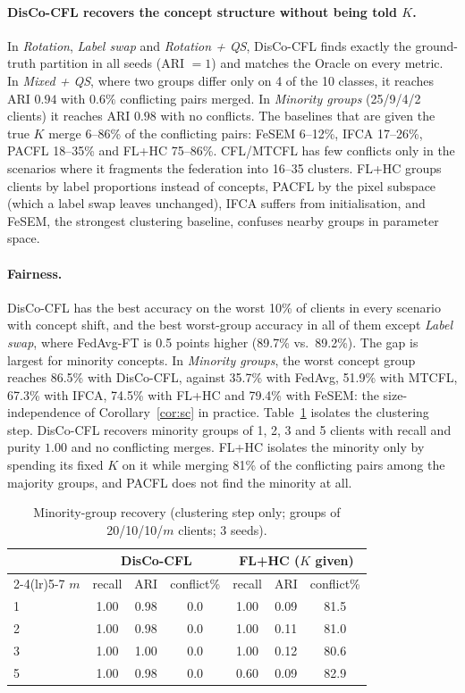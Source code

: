\paragraph{DisCo-CFL recovers the concept structure without being told $K$.} In \emph{Rotation}, \emph{Label swap} and \emph{Rotation + QS}, DisCo-CFL finds exactly the ground-truth partition in all seeds (ARI $=1$) and matches the Oracle on every metric. In \emph{Mixed + QS}, where two groups differ only on 4 of the 10 classes, it reaches ARI $0.94$ with $0.6\%$ conflicting pairs merged. In \emph{Minority groups} (25/9/4/2 clients) it reaches ARI $0.98$ with no conflicts. The baselines that are given the true $K$ merge 6--86\% of the conflicting pairs: FeSEM 6--12\%, IFCA 17--26\%, PACFL 18--35\% and FL+HC 75--86\%. CFL/MTCFL has few conflicts only in the scenarios where it fragments the federation into 16--35 clusters. FL+HC groups clients by label proportions instead of concepts, PACFL by the pixel subspace (which a label swap leaves unchanged), IFCA suffers from initialisation, and FeSEM, the strongest clustering baseline, confuses nearby groups in parameter space.

\paragraph{Fairness.} DisCo-CFL has the best accuracy on the worst 10\% of clients in every scenario with concept shift, and the best worst-group accuracy in all of them except \emph{Label swap}, where FedAvg-FT is 0.5 points higher (89.7\% vs.\ 89.2\%). The gap is largest for minority concepts. In \emph{Minority groups}, the worst concept group reaches 86.5\% with DisCo-CFL, against 35.7\% with FedAvg, 51.9\% with MTCFL, 67.3\% with IFCA, 74.5\% with FL+HC and 79.4\% with FeSEM: the size-independence of Corollary~\ref{cor:sc} in practice. Table~\ref{tab:minority} isolates the clustering step. DisCo-CFL recovers minority groups of 1, 2, 3 and 5 clients with recall and purity $1.00$ and no conflicting merges. FL+HC isolates the minority only by spending its fixed $K$ on it while merging 81\% of the conflicting pairs among the majority groups, and PACFL does not find the minority at all.

\begin{table}[!htbp]
\centering
\caption{Minority-group recovery (clustering step only; groups of 20/10/10/$m$ clients; 3 seeds).}\label{tab:minority}
\small
\begin{tabular}{lcccccc}
\toprule
& \multicolumn{3}{c}{DisCo-CFL} & \multicolumn{3}{c}{FL+HC ($K$ given)} \\
\cmidrule(lr){2-4}\cmidrule(lr){5-7}
$m$ & recall & ARI & conflict\% & recall & ARI & conflict\% \\
\midrule
1 & 1.00 & 0.98 & 0.0 & 1.00 & 0.09 & 81.5\\
2 & 1.00 & 0.98 & 0.0 & 1.00 & 0.11 & 81.0\\
3 & 1.00 & 1.00 & 0.0 & 1.00 & 0.12 & 80.6\\
5 & 1.00 & 0.98 & 0.0 & 0.60 & 0.09 & 82.9\\
\bottomrule
\end{tabular}
\end{table}

